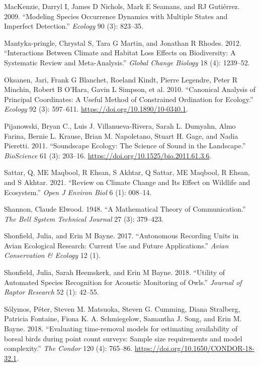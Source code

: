 \documentclass[
  letterpaper,
  DIV=11,
  numbers=noendperiod]{scrartcl}
\newlength{\cslhangindent}
\newenvironment{CSLReferences}[2] %
 {\begin{list}{}{%
  \setlength{\itemindent}{0pt}
  \setlength{\leftmargin}{0pt}
  \setlength{\parsep}{0pt}
  \ifodd #1
   \setlength{\leftmargin}{\cslhangindent}
   \setlength{\itemindent}{-1\cslhangindent}
  \fi
  \setlength{\itemsep}{#2\baselineskip}}}
 {\end{list}}
\begin{document}
\begin{CSLReferences}{1}{0}
MacKenzie, Darryl I, James D Nichols, Mark E Seamans, and RJ Gutiérrez.
2009. {``Modeling Species Occurrence Dynamics with Multiple States and
Imperfect Detection.''} \emph{Ecology} 90 (3): 823--35.

Mantyka-pringle, Chrystal S, Tara G Martin, and Jonathan R Rhodes. 2012.
{``Interactions Between Climate and Habitat Loss Effects on
Biodiversity: A Systematic Review and Meta-Analysis.''} \emph{Global
Change Biology} 18 (4): 1239--52.

Oksanen, Jari, Frank G Blanchet, Roeland Kindt, Pierre Legendre, Peter R
Minchin, Robert B O'Hara, Gavin L Simpson, et al. 2010. {``Canonical
Analysis of Principal Coordinates: A Useful Method of Constrained
Ordination for Ecology.''} \emph{Ecology} 92 (3): 597--611.
\url{https://doi.org/10.1890/10-0340.1}.

Pijanowski, Bryan C., Luis J. Villanueva-Rivera, Sarah L. Dumyahn, Almo
Farina, Bernie L. Krause, Brian M. Napoletano, Stuart H. Gage, and Nadia
Pieretti. 2011. {``Soundscape Ecology: The Science of Sound in the
Landscape.''} \emph{BioScience} 61 (3): 203--16.
\url{https://doi.org/10.1525/bio.2011.61.3.6}.

Sattar, Q, ME Maqbool, R Ehsan, S Akhtar, Q Sattar, ME Maqbool, R Ehsan,
and S Akhtar. 2021. {``Review on Climate Change and Its Effect on
Wildlife and Ecosystem.''} \emph{Open J Environ Biol} 6 (1): 008--14.

Shannon, Claude Elwood. 1948. {``A Mathematical Theory of
Communication.''} \emph{The Bell System Technical Journal} 27 (3):
379--423.

Shonfield, Julia, and Erin M Bayne. 2017. {``Autonomous Recording Units
in Avian Ecological Research: Current Use and Future Applications.''}
\emph{Avian Conservation \& Ecology} 12 (1).

Shonfield, Julia, Sarah Heemskerk, and Erin M Bayne. 2018. {``Utility of
Automated Species Recognition for Acoustic Monitoring of Owls.''}
\emph{Journal of Raptor Research} 52 (1): 42--55.

Sólymos, Péter, Steven M. Matsuoka, Steven G. Cumming, Diana Stralberg,
Patricia Fontaine, Fiona K. A. Schmiegelow, Samantha J. Song, and Erin
M. Bayne. 2018. {``{Evaluating time-removal models for estimating
availability of boreal birds during point count surveys: Sample size
requirements and model complexity}.''} \emph{The Condor} 120 (4):
765--86. \url{https://doi.org/10.1650/CONDOR-18-32.1}.


\end{CSLReferences}
\end{document}
